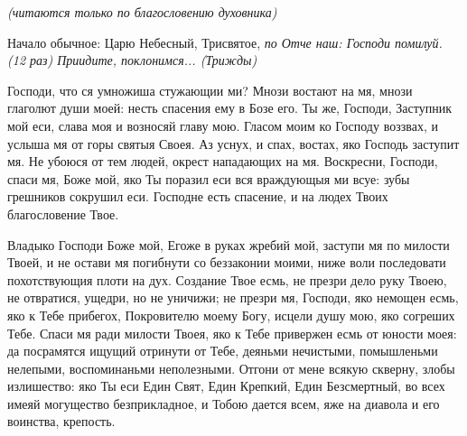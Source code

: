 








 


\itshape (читаются только по благословению духовника)

\normalfont{}

Начало обычное: Царю Небесный,  Трисвятое,  \itshape по\normalfont{} Отче наш: Господи помилуй. (12 раз) Приидите, поклонимся... (\itshape Трижды\normalfont{})




Господи, что ся умножиша стужающии ми? Мнози востают на мя, мнози глаголют души моей: несть спасения ему в Бозе его. Ты же, Господи, Заступник мой еси, слава моя и возносяй главу мою. Гласом моим ко Господу воззвах, и услыша мя от горы святыя Своея. Аз уснух, и спах, востах, яко Господь заступит мя. Не убоюся от тем людей, окрест нападающих на мя. Воскресни, Господи, спаси мя, Боже мой, яко Ты поразил еси вся враждующыя ми всуе: зубы грешников сокрушил еси. Господне есть спасение, и на людех Твоих благословение Твое.




Владыко Господи Боже мой, Егоже в руках жребий мой, заступи мя по милости Твоей, и не остави мя погибнути со беззаконии моими, ниже воли последовати похотствующия плоти на дух. Создание Твое есмь, не презри дело руку Твоею, не отвратися, ущедри, но не уничижи;  не презри мя, Господи, яко немощен есмь, яко к Тебе прибегох, Покровителю моему Богу, исцели душу мою, яко согреших Тебе. Спаси мя ради милости Твоея, яко к Тебе привержен есмь от юности моея: да посрамятся ищущий отринути от Тебе, деяньми нечистыми, помышленьми  нелепыми,  воспоминаньми неполезными. Отгони от мене всякую скверну, злобы излишество: яко Ты еси Един Свят, Един Крепкий, Един Безсмертный, во всех имеяй могущество безприкладное, и Тобою дается всем, яже на диавола и его воинства, крепость.

